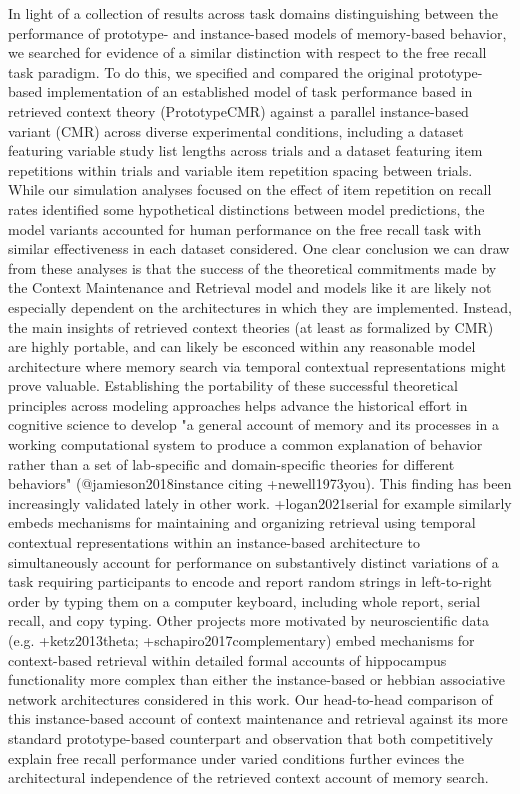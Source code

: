 In light of a collection of results across task domains distinguishing between the performance of prototype- and instance-based models of memory-based behavior, we searched for evidence of a similar distinction with respect to the free recall task paradigm. To do this, we specified and compared the original prototype-based implementation of an established model of task performance based in retrieved context theory (PrototypeCMR) against a parallel instance-based variant (CMR) across diverse experimental conditions, including a dataset featuring variable study list lengths across trials and a dataset featuring item repetitions within trials and variable item repetition spacing between trials. While our simulation analyses focused on the effect of item repetition on recall rates identified some hypothetical distinctions between model predictions, the model variants accounted for human performance on the free recall task with similar effectiveness in each dataset considered.\markdownRendererInterblockSeparator
{}One clear conclusion we can draw from these analyses is that the success of the theoretical commitments made by the Context Maintenance and Retrieval model and models like it are likely not especially dependent on the architectures in which they are implemented. Instead, the main insights of retrieved context theories (at least as formalized by CMR) are highly portable, and can likely be esconced within any reasonable model architecture where memory search via temporal contextual representations might prove valuable. Establishing the portability of these successful theoretical principles across modeling approaches helps advance the historical effort in cognitive science to develop "a general account of memory and its processes in a working computational system to produce a common explanation of behavior rather than a set of lab-specific and domain-specific theories for different behaviors" (@jamieson2018instance citing +{}{}{newell1973you}).\markdownRendererInterblockSeparator
{}This finding has been increasingly validated lately in other work. +{}{}{logan2021serial} for example similarly embeds mechanisms for maintaining and organizing retrieval using temporal contextual representations within an instance-based architecture to simultaneously account for performance on substantively distinct variations of a task requiring participants to encode and report random strings in left-to-right order by typing them on a computer keyboard, including whole report, serial recall, and copy typing. Other projects more motivated by neuroscientific data (e.g. +{}{}{ketz2013theta}; +{}{}{schapiro2017complementary}) embed mechanisms for context-based retrieval within detailed formal accounts of hippocampus functionality more complex than either the instance-based or hebbian associative network architectures considered in this work. Our head-to-head comparison of this instance-based account of context maintenance and retrieval against its more standard prototype-based counterpart and observation that both competitively explain free recall performance under varied conditions further evinces the architectural independence of the retrieved context account of memory search.\markdownRendererInterblockSeparator
